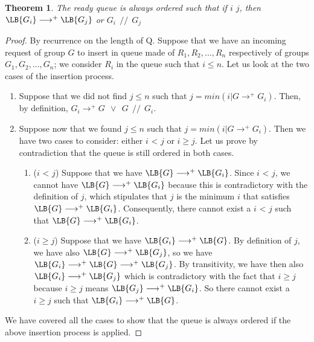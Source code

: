 \documentclass[11pt]{report}
\begin{document}
\newtheorem{insertion}{Theorem}
\begin{insertion}
The ready queue is always ordered such that if $i$ \le $j$, then $\LB{G_i}\longrightarrow^{+}\LB{G_j}$ or $G_i~\ //~\ G_j$
\end{insertion}
\begin{proof}
By recurrence on the length of Q.
Suppose that we have an incoming request of group $G$ to insert in queue made of $R_1,R_2,...,R_n$ respectively of groups $G_1,G_2,...,G_n$; we consider $R_i$ in the queue such that $i \le n$. Let us look at the two cases of the insertion process.
\begin{enumerate}
\item Suppose that we did not find $j \le n$ such that $j=min({i|G\longrightarrow^{+}G_i})$. Then, by definition, $G_i\longrightarrow^{+}G~\ \vee~\ G~\ //~\ G_i$.
\item Suppose now that we found $j \le n$ such that $j=min({i|G\longrightarrow^{+}G_i})$. Then we have two cases to consider: either $i$ < $j$ or $i \ge j$. Let us prove by contradiction that the queue is still ordered in both cases.
	\begin{enumerate}
		\item ($i$ < $j$) Suppose that we have $\LB{G}\longrightarrow^{+}\LB{G_i}$. Since $i$ < $j$, we cannot have $\LB{G}\longrightarrow^{+}\LB{G_i}$ because this is contradictory with the definition of $j$, which stipulates that $j$ is the minimum $i$ that satisfies $\LB{G}\longrightarrow^{+}\LB{G_i}$. Consequently, there cannot exist a $i$ < $j$ such that $\LB{G}\longrightarrow^{+}\LB{G_i}$.
		\item ($i \ge j$) Suppose that we have $\LB{G_i}\longrightarrow^{+}\LB{G}$. By definition of $j$, we have also $\LB{G}\longrightarrow^{+}\LB{G_j}$, so we have $\LB{G_i}\longrightarrow^{+}\LB{G}\longrightarrow^{+}\LB{G_j}$. By transitivity, we have then also $\LB{G_i}\longrightarrow^{+}\LB{G_j}$ which is contradictory with the fact that $i \ge j$ because $i \ge j$ means $\LB{G_j}\longrightarrow^{+}\LB{G_i}$. So there cannot exist a $i \ge j$ such that $\LB{G_i}\longrightarrow^{+}\LB{G}$.
	\end{enumerate}
\end{enumerate}
We have covered all the cases to show that the queue is always ordered if the above insertion process is applied.
\end{proof}
\end{document}
